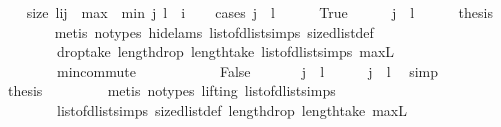 \begin{isabellebody}
\ \ \isamarkupfalse%
\ {\isachardoublequoteopen}size\ {\isacharparenleft}l{\isasymdagger}i{\isachardot}{\isachardot}j{\isacharparenright}\ {\isacharequal}\ max\ {}\ {\isacharparenleft}min\ j\ {\isacharparenleft}{\isacharhash}l{\isacharparenright}\ {\isacharminus}\ i{\isacharparenright}{\isachardoublequoteclose}\isanewline
\ \ \isamarkupfalse%
\ {\isacharparenleft}cases\ {\isachardoublequoteopen}j\ {\isasymle}\ {\isacharhash}l{\isachardoublequoteclose}{\isacharparenright}\isanewline
\ \ \ \ \isamarkupfalse%
\ True\isanewline
\ \ \ \ \isamarkupfalse%
\ {\isachardoublequoteopen}j\ {\isasymle}\ {\isacharhash}l{\isachardoublequoteclose}\isanewline
\ \ \ \ \isamarkupfalse%
\ {\isacharquery}thesis\isanewline
\ \ \ \ \ \ \isamarkupfalse%
\ {\isacharparenleft}metis\ {\isacharparenleft}no{\isacharunderscore}types{\isacharcomma}\ hide{\isacharunderscore}lams{\isacharparenright}\ list{\isacharunderscore}of{\isacharunderscore}dlist{\isacharunderscore}simps{\isacharparenleft}{}{\isacharparenright}\ size{\isacharunderscore}dlist{\isacharunderscore}def\ \isanewline
\ \ \ \ \ \ \ \ drop{\isacharunderscore}take\ length{\isacharunderscore}drop\ length{\isacharunderscore}take\ list{\isacharunderscore}of{\isacharunderscore}dlist{\isacharunderscore}simps{\isacharparenleft}{}{\isacharparenright}\ max{\isacharunderscore}{}L\ \isanewline
\ \ \ \ \ \ \ \ min{\isachardot}commute{\isacharparenright}\ \isanewline
\ \ \ \ \isamarkupfalse%
\isanewline
\ \ \ \ \isamarkupfalse%
\ False\isanewline
\ \ \ \ \isamarkupfalse%
\ {\isachardoublequoteopen}{\isasymnot}\ {\isacharparenleft}j\ {\isasymle}\ {\isacharhash}l{\isacharparenright}{\isachardoublequoteclose}\isanewline
\ \ \ \ \isamarkupfalse%
\ {\isachardoublequoteopen}j\ {\isachargreater}\ {\isacharhash}l{\isachardoublequoteclose}\ \isamarkupfalse%
\ simp\isanewline
\ \ \ \ \isamarkupfalse%
\ {\isacharquery}thesis\ \isanewline
\ \ \ \ \ \ \isamarkupfalse%
\ {\isacharparenleft}metis\ {\isacharparenleft}no{\isacharunderscore}types{\isacharcomma}\ lifting{\isacharparenright}\ list{\isacharunderscore}of{\isacharunderscore}dlist{\isacharunderscore}simps{\isacharparenleft}{}{\isacharparenright}\ \isanewline
\ \ \ \ \ \ \ \ list{\isacharunderscore}of{\isacharunderscore}dlist{\isacharunderscore}simps{\isacharparenleft}{}{\isacharparenright}\ size{\isacharunderscore}dlist{\isacharunderscore}def\ length{\isacharunderscore}drop\ length{\isacharunderscore}take\ max{\isacharunderscore}{}L\ \isanewline

\end{isabellebody}
